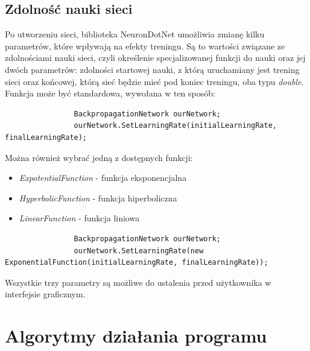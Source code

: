\documentclass[a4paper]{article}
\begin{document}
		\subsection{Zdolność nauki sieci}\indent\indent
			Po utworzeniu sieci, biblioteka NeuronDotNet umożliwia zmianę kilku parametrów, które wpływają na efekty treningu. Są to wartości związane ze zdolnościami nauki sieci, czyli określenie specjalizowanej funkcji do nauki oraz jej dwóch parametrów: zdolności startowej nauki, z którą uruchamiany jest trening sieci oraz końcowej, którą sieć będzie mieć pod koniec treningu, oba typu \textit{double}.\\\indent
			Funkcja może być standardowa, wywołana w ten sposób:
			\begin{lstlisting}
				BackpropagationNetwork ourNetwork;
				ourNetwork.SetLearningRate(initialLearningRate, finalLearningRate);
			\end{lstlisting}
			Można również wybrać jedną z dostępnych funkcji:
			\begin{itemize}
				\item \emph{ExpotentialFunction} - funkcja eksponencjalna
				\item \emph{HyperbolicFunction} - funkcja hiperboliczna
				\item \emph{LinearFunction} - funkcja liniowa
			\end{itemize}
			\begin{lstlisting}
				BackpropagationNetwork ourNetwork;
				ourNetwork.SetLearningRate(new ExponentialFunction(initialLearningRate, finalLearningRate));
			\end{lstlisting}
			Wszystkie trzy parametry są możliwe do ustalenia przed użytkownika w interfejsie graficznym.
	\section{Algorytmy działania programu}
\end{document}
